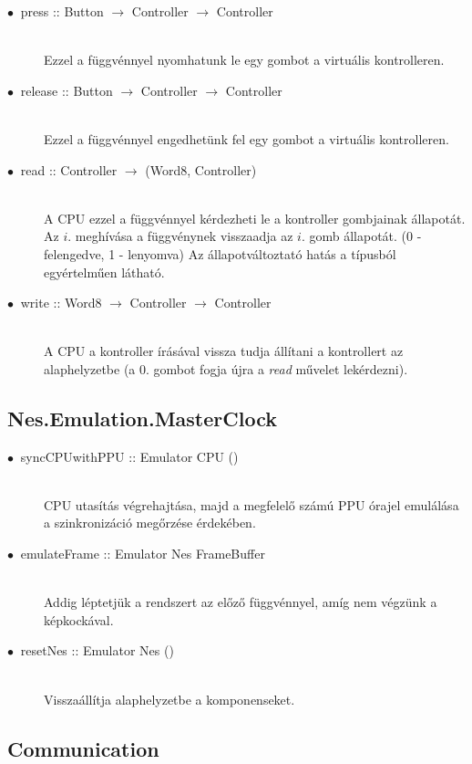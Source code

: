\begin{description}
	\item[$\bullet\:$ press :: Button $\rightarrow$ Controller $\rightarrow$ Controller] \hfill \\
	Ezzel a függvénnyel nyomhatunk le egy gombot a virtuális kontrolleren.
	\item[$\bullet\:$ release :: Button $\rightarrow$ Controller $\rightarrow$ Controller] \hfill \\
	Ezzel a függvénnyel engedhetünk fel egy gombot a virtuális kontrolleren.
	\item[$\bullet\:$ read :: Controller $\rightarrow$ (Word8, Controller)] \hfill \\
		A CPU ezzel a függvénnyel kérdezheti le a kontroller gombjainak állapotát.
		Az $i.$ meghívása a függvénynek visszaadja az $i.$ gomb állapotát. (0 - felengedve, 1 - lenyomva) Az állapotváltoztató hatás a típusból egyértelműen látható.
	\item[$\bullet\:$ write :: Word8 $\rightarrow$ Controller $\rightarrow$ Controller] \hfill \\
		A CPU a kontroller írásával vissza tudja állítani a kontrollert az alaphelyzetbe (a 0. gombot fogja újra a \emph{read} művelet lekérdezni).
	
\end{description}

\subsection{Nes.Emulation.MasterClock}

\begin{description}
	\item[$\bullet\:$ syncCPUwithPPU :: Emulator CPU ()] \hfill \\
	CPU utasítás végrehajtása, majd a megfelelő számú PPU órajel emulálása a szinkronizáció megőrzése érdekében.
	\item[$\bullet\:$ emulateFrame :: Emulator Nes FrameBuffer] \hfill \\
	Addig léptetjük a rendszert az előző függvénnyel, amíg nem végzünk a képkockával.
	\item[$\bullet\:$ resetNes :: Emulator Nes ()] \hfill \\
	Visszaállítja alaphelyzetbe a komponenseket. 
\end{description}

\subsection{Communication}

